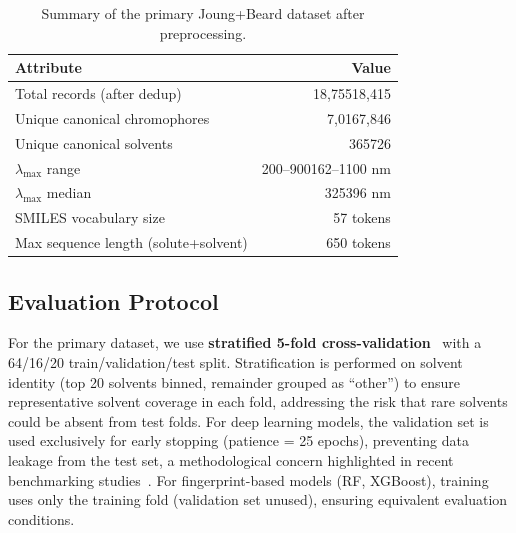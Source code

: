 \documentclass[journal=jcisd8,manuscript=article]{achemso}
\newcommand{\added}[1]{{\color{addedblue}#1}}
\newcommand{\removed}[1]{{\color{removedred}#1}}
\begin{document}
\begin{table}[htbp]
\centering
\caption{Summary of the primary Joung+Beard dataset after preprocessing.}
\label{tab:dataset_summary}
\begin{tabular}{lr}
\toprule
\textbf{Attribute} & \textbf{Value} \\
\midrule
Total records \added{(after dedup)} & \removed{18,755}\added{18,415} \\
Unique \added{canonical }chromophores & \removed{7,016}\added{7,846} \\
Unique \added{canonical }solvents & \removed{365}\added{726} \\
$\lambda_{\max}$ range & \removed{200--900}\added{162--1100} nm \\
$\lambda_{\max}$ median & \removed{325}\added{396} nm \\
SMILES vocabulary size & 57 tokens \\
Max sequence length (solute+solvent) & 650 tokens \\
\bottomrule
\end{tabular}
\end{table}


\subsection{Evaluation Protocol}
\label{sec:evaluation}

For the primary dataset, we use \textbf{stratified 5-fold cross-validation}~\cite{kohavi1995study} with a 64/16/20 train/validation/test split.
Stratification is performed on solvent identity (top 20 solvents binned, remainder grouped as ``other'') to ensure representative solvent coverage in each fold, addressing the risk that rare solvents could be absent from test folds.
For deep learning models, the validation set is used exclusively for early stopping (patience = 25 epochs), preventing data leakage from the test set, a methodological concern highlighted in recent benchmarking studies~\cite{panapitiya2022evaluation}.
For fingerprint-based models (RF, XGBoost), training uses only the training fold (validation set unused), ensuring equivalent evaluation conditions.
\end{document}
